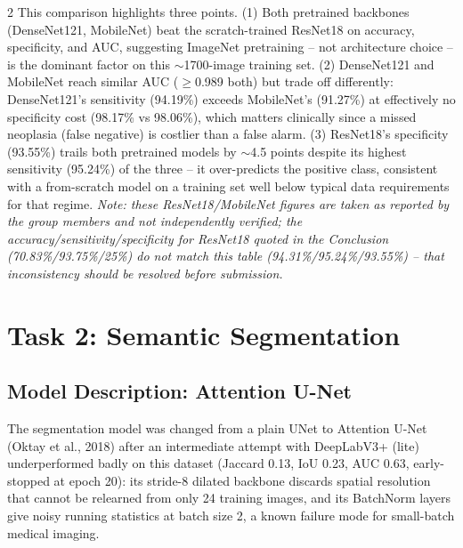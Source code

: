 ﻿\documentclass[a4paper,10pt]{article}
\begin{document}
\begin{multicols*}{2}
This comparison highlights three points. (1) Both pretrained backbones (DenseNet121, MobileNet) beat the scratch-trained ResNet18 on accuracy, specificity, and AUC, suggesting ImageNet pretraining -- not architecture choice -- is the dominant factor on this $\sim$1700-image training set. (2) DenseNet121 and MobileNet reach similar AUC ($\geq$0.989 both) but trade off differently: DenseNet121's sensitivity (94.19\%) exceeds MobileNet's (91.27\%) at effectively no specificity cost (98.17\% vs 98.06\%), which matters clinically since a missed neoplasia (false negative) is costlier than a false alarm. (3) ResNet18's specificity (93.55\%) trails both pretrained models by $\sim$4.5 points despite its highest sensitivity (95.24\%) of the three -- it over-predicts the positive class, consistent with a from-scratch model on a training set well below typical data requirements for that regime. \textit{Note: these ResNet18/MobileNet figures are taken as reported by the group members and not independently verified; the accuracy/sensitivity/specificity for ResNet18 quoted in the Conclusion (70.83\%/93.75\%/25\%) do not match this table (94.31\%/95.24\%/93.55\%) -- that inconsistency should be resolved before submission.}

\section{Task 2: Semantic Segmentation}

\subsection{Model Description: Attention U-Net}
The segmentation model was changed from a plain UNet to Attention U-Net (Oktay et al., 2018) after an intermediate attempt with DeepLabV3+ (lite) underperformed badly on this dataset (Jaccard 0.13, IoU 0.23, AUC 0.63, early-stopped at epoch 20): its stride-8 dilated backbone discards spatial resolution that cannot be relearned from only 24 training images, and its BatchNorm layers give noisy running statistics at batch size 2, a known failure mode for small-batch medical imaging.


\end{multicols*}
\end{document}
